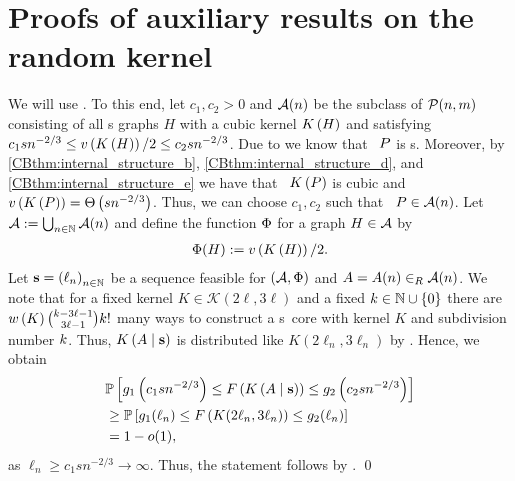 \section{Proofs of auxiliary results on the random kernel}\label{CBsec:proofs_aux3}
We will use . To this end, let $c_1, c_2>0$ and $\mathcal{A}(n)$ be the subclass of $\mathcal{P}(n,m)$ consisting of all \2s graphs $H$ with a cubic kernel $K\left(H\right)$ and satisfying $c_1sn^{-2/3}\leq v\left({K\left(H\right)}\right)/2\leq c_2sn^{-2/3}$. Due to  we know that \whp\ $P$ is \2s. Moreover, by \ref{CBthm:internal_structure_b}, \ref{CBthm:internal_structure_d}, and \ref{CBthm:internal_structure_e} we have that \whp\ $K\left(P\right)$ is cubic and $v\left({K\left(P\right)}\right)=\Theta\left(sn^{-2/3}\right)$. Thus, we can choose $c_1, c_2$ such that \whp\ $P \in \mathcal{A}(n)$. Let $ \mathcal{A}:=\bigcup_{n\in\mathbb{N}} \mathcal{A}(n)$ and define the function $\Phi$ for a graph $H \in \mathcal{A}$ by 
\begin{align*}
\Phi(H):=v\left({K\left(H\right)}\right)/2.
\end{align*}
Let $\mathbf{s}=\left(\ell_n\right)_{n\in \mathbb{N}}$ be a sequence feasible for $\left(\mathcal{A}, \Phi\right)$ and $A=A(n)\in_R \mathcal{A}(n)$. We note that for a fixed kernel $K\in \mathcal{K}(2\ell, 3\ell)$ and a fixed $k \in \mathbb{N} \cup \{0\}$ there are $w\left(K\right)\binom{k-3\ell-1}{3\ell-1}k!$ many ways to construct a \2s\ core with kernel $K$ and subdivision number $k$. Thus, $K\left(A \mid \mathbf{s}\right)$ is distributed like $K\left(2\ell_n, 3\ell_n\right)$ by . Hence, we obtain
\begin{align*}
&\mathbb{P}\left[g_1\left(c_1sn^{-2/3}\right)\leq F\left(K\left(A \mid \mathbf{s}\right)\right)\leq g_2\left(c_2sn^{-2/3}\right)\right]
\\
&\geq \mathbb{P}\left[g_1(\ell_n)\leq F\left(K(2\ell_n, 3\ell_n)\right)\leq g_2(\ell_n)\right]\\
&=1-o(1),
\end{align*}
as $\ell_n\geq c_1sn^{-2/3}\to \infty$. Thus, the statement follows by .
\qed

